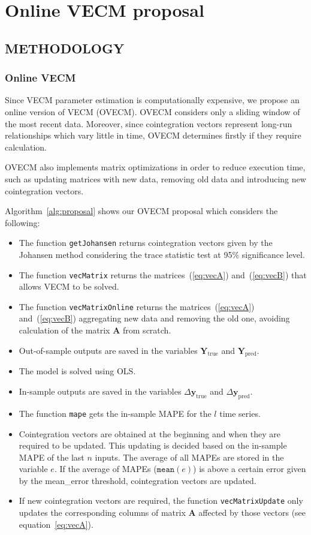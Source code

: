 \chapter{Online VECM proposal}
\section{\uppercase{Methodology}}
\label{sec:methodology}
\noindent 
\subsection{Online VECM} \label{sec:proposal}

Since VECM parameter estimation is computationally expensive, we propose an
online version of VECM (OVECM).  OVECM considers only a sliding window of the
most recent data. Moreover, since cointegration vectors represent long-run
relationships which vary little in time, OVECM determines firstly if they require calculation. 

OVECM also implements matrix optimizations in order to reduce execution time,
such as updating matrices with new data, removing old data and introducing new
cointegration vectors.

Algorithm~\ref{alg:proposal} shows our OVECM proposal which considers the
following:

\begin{itemize}
\item The function \texttt{getJohansen} returns cointegration vectors given by
the Johansen method considering the trace statistic test at 95\%
significance level.
\item The function \texttt{vecMatrix} returns the matrices~(\ref{eq:vecA})
and~(\ref{eq:vecB}) that allows VECM to be solved.
\item The function \texttt{vecMatrixOnline} returns the
matrices~(\ref{eq:vecA}) and~(\ref{eq:vecB}) aggregating new data and removing
the old one, avoiding calculation of the matrix $\mathbf{A}$ from scratch.
\item Out-of-sample outputs are saved in the variables 
$\mathbf{Y}_{\text{true}}$ and $\mathbf{Y}_{\text{pred}}$.
\item The model is solved using OLS.
\item In-sample outputs are saved in the variables $\Delta
\mathbf{y}_{\text{true}}$ and $\Delta \mathbf{y}_{\text{pred}}$.
\item The function \texttt{mape} gets the in-sample MAPE for the $l$ time
series.
\item Cointegration vectors are obtained at the beginning and when they are required to be updated. This updating is decided based on the in-sample MAPE of the last $n$ inputs. The average of all
MAPEs are stored in the variable $e$. If the average of MAPEs
($\texttt{mean}(e)$) is above a certain error given by the mean\_error threshold, cointegration vectors are updated.
\item If new cointegration vectors are required, the function
\texttt{vecMatrixUpdate} only updates the corresponding columns of matrix
$\mathbf{A}$ affected by those vectors (see equation~\ref{eq:vecA}).
\end{itemize}

